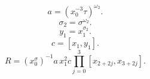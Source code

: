 \[a=(x_0^{-3}\tau)^{\omega_2}.\]
\[\sigma_2=\sigma^{\omega_2}.\]
\[y_1=x_1^{\sigma_2}.\]
\[c=[x_1,y_1].\]
\[R=(x_0^\sigma)^{-1}a\,x_1^2c\prod_{j=0}^3[x_{2+2j},x_{3+2j}].\]
